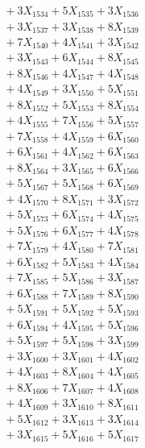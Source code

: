 \documentclass[a4paper,10pt]{article}
\begin{document}
{\begin{align}
&\;  + 3 X_{1534} + 5 X_{1535} + 3 X_{1536} \\[0.3ex]
&\;  + 3 X_{1537} + 3 X_{1538} + 8 X_{1539} \\[0.5ex]\allowbreak
&\;  + 7 X_{1540} + 4 X_{1541} + 3 X_{1542} \\[0.3ex]
&\;  + 3 X_{1543} + 6 X_{1544} + 8 X_{1545} \\[0.3ex]
&\;  + 8 X_{1546} + 4 X_{1547} + 4 X_{1548} \\[0.3ex]
&\;  + 4 X_{1549} + 3 X_{1550} + 5 X_{1551} \\[0.3ex]
&\;  + 8 X_{1552} + 5 X_{1553} + 8 X_{1554} \\[0.3ex]
&\;  + 4 X_{1555} + 7 X_{1556} + 5 X_{1557} \\[0.3ex]
&\;  + 7 X_{1558} + 4 X_{1559} + 6 X_{1560} \\[0.3ex]
&\;  + 6 X_{1561} + 4 X_{1562} + 6 X_{1563} \\[0.3ex]
&\;  + 8 X_{1564} + 3 X_{1565} + 6 X_{1566} \\[0.3ex]
&\;  + 5 X_{1567} + 5 X_{1568} + 6 X_{1569} \\[0.5ex]\allowbreak
&\;  + 4 X_{1570} + 8 X_{1571} + 3 X_{1572} \\[0.3ex]
&\;  + 5 X_{1573} + 6 X_{1574} + 4 X_{1575} \\[0.3ex]
&\;  + 5 X_{1576} + 6 X_{1577} + 4 X_{1578} \\[0.3ex]
&\;  + 7 X_{1579} + 4 X_{1580} + 7 X_{1581} \\[0.3ex]
&\;  + 6 X_{1582} + 5 X_{1583} + 4 X_{1584} \\[0.3ex]
&\;  + 7 X_{1585} + 5 X_{1586} + 3 X_{1587} \\[0.3ex]
&\;  + 6 X_{1588} + 7 X_{1589} + 8 X_{1590} \\[0.3ex]
&\;  + 5 X_{1591} + 5 X_{1592} + 5 X_{1593} \\[0.3ex]
&\;  + 6 X_{1594} + 4 X_{1595} + 5 X_{1596} \\[0.3ex]
&\;  + 5 X_{1597} + 5 X_{1598} + 3 X_{1599} \\[0.5ex]\allowbreak
&\;  + 3 X_{1600} + 3 X_{1601} + 4 X_{1602} \\[0.3ex]
&\;  + 4 X_{1603} + 8 X_{1604} + 4 X_{1605} \\[0.3ex]
&\;  + 8 X_{1606} + 7 X_{1607} + 4 X_{1608} \\[0.3ex]
&\;  + 4 X_{1609} + 3 X_{1610} + 8 X_{1611} \\[0.3ex]
&\;  + 5 X_{1612} + 3 X_{1613} + 3 X_{1614} \\[0.3ex]
&\;  + 3 X_{1615} + 5 X_{1616} + 5 X_{1617} \\[0.3ex]

\end{align}}
\end{document}

